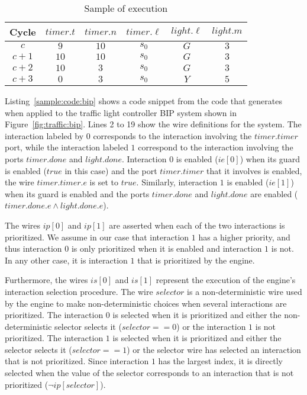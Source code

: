 \begin{table}[bt]
\centering
\caption{Sample of \biptool{} execution}
\begin{tabular}{|c|c|c|c|c|c|}
\hline
Cycle & $timer.t$ & $timer.n$ & $timer.\ell$ & $light.\ell$ & $light.m$ \\ 
\hline
$c$ & $9$ & $10$ & $s_0$ & $G$ & $3$ \\
		\hline
		$c+1$ & $10$ & $10$ & $s_0$ & $G$ & $3$ \\
			\hline
			$c+2$ & $10$ & $3$ & $s_0$ & $G$ & $3$ \\
				\hline
	  $c+3$ & $0$ & $3$ & $s_0$ & $Y$ & $5$ \\
	  \hline
\end{tabular}
\label{tb:bip:exec}
\end{table}

Listing~\ref{sample:code:bip} shows a code snippet from the code that \biptool{} generates
when applied to the traffic light controller BIP system shown in Figure~\ref{fig:traffic:bip}.
Lines 2 to 19 show the wire definitions for the system. The interaction 
labeled by $0$ corresponds to the interaction involving the $timer.timer$
port, while the interaction labeled $1$ correspond to the interaction 
involving the ports $timer.done$ and $light.done$. 
Interaction $0$ is enabled ($ie[0]$) when its guard is enabled ($true$ 
in this case) and the port $timer.timer$ that it involves is enabled, 
\ie{} the wire $timer.timer.e$ is set to $true$. 
Similarly, interaction $1$ is enabled ($ie[1]$) when its guard is
enabled and the ports $timer.done$ and $light.done$ are enabled 
($timer.done.e \land light.done.e$).

The wires $ip[0]$ and $ip[1]$ are asserted when each of the two interactions 
is prioritized. We assume in our case that interaction $1$ has a higher
priority, and thus interaction $0$ is only prioritized when it is enabled
and interaction $1$ is not. In any other case, it is interaction $1$ that
is prioritized by the engine. 

Furthermore, the wires $is[0]$ and $is[1]$ represent the execution of the 
engine's interaction selection procedure. The wire $selector$ is
a non-deterministic wire used by the engine to make non-deterministic
choices when several interactions are prioritized. 
The interaction $0$ is selected
when it is prioritized and either the non-deterministic selector 
selects it ($selector == 0$)
or the interaction $1$ is not prioritized. 
The interaction $1$ is selected when it is prioritized and either 
the selector selects it ($selector == 1$) or the selector wire
has selected an interaction that is not prioritized. Since interaction
$1$ has the largest index, it is
directly selected when the value of the selector corresponds
to an interaction that is not prioritized ($\lnot ip[selector]$).

